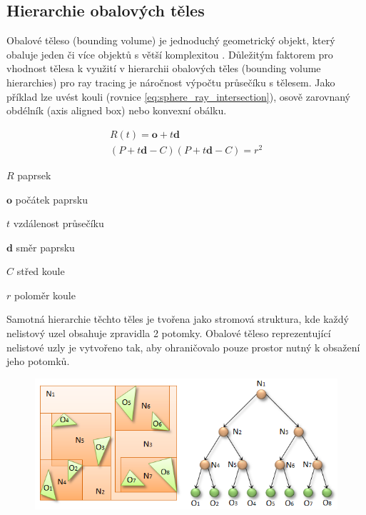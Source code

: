 \subsection{Hierarchie obalových těles} \label{sec:BVH}
Obalové těleso (bounding volume) je jednoduchý geometrický objekt, který obaluje jeden či více objektů s větší komplexitou \cite{ericson_2005}. Důležitým faktorem pro vhodnost tělesa k využití v hierarchii obalových těles (bounding volume hierarchies) pro ray tracing je náročnost výpočtu průsečíku s tělesem. Jako příklad lze uvést kouli (rovnice \ref{eq:sphere_ray_intersection}), osově zarovnaný obdélník (axis aligned box) nebo konvexní obálku. 

\begin{equation} \label{eq:sphere_ray_intersection}
	\begin{gathered}
	    R(t) = \textbf{o} + t\textbf{d}  \\
	    
	    (P + t\textbf{d} - C) (P + t\textbf{d} - C) = r^2
	    
	\end{gathered}
\end{equation}

\begin{eqexpl}[60mm]
\item{$R$} paprsek
\item{$\textbf{o}$} počátek paprsku
\item{$t$} vzdálenost průsečíku
\item{$\textbf{d}$} směr paprsku
\item{$C$} střed koule
\item{$r$} poloměr koule
\end{eqexpl}

Samotná hierarchie těchto těles je tvořena jako stromová struktura, kde každý nelistový uzel obsahuje zpravidla 2 potomky. Obalové těleso reprezentující nelistové uzly je vytvořeno tak, aby ohraničovalo pouze prostor nutný k obsažení jeho potomků.

\begin{figure}[H]
	\centering
	\includegraphics[scale=0.5]{images/fig03-bvh.png}
	\captionsetup{justification=centering}
	\label{fig:slabs}
\end{figure}

